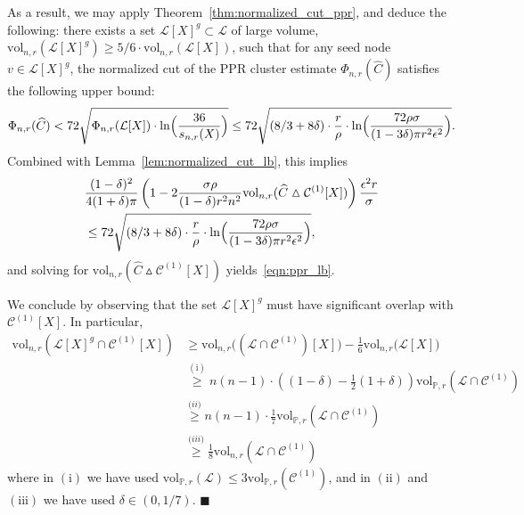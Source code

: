 \documentclass[twoside,11pt]{article}
\newcommand{\1}{\mathbf{1}}
\newcommand{\mc}[1]{\mathcal{#1}}
\newcommand{\Pbb}{\mathbb{P}}
\newcommand{\wh}[1]{\widehat{#1}}
\newcommand{\vol}{\mathrm{vol}}
\newcommand{\qed}{\hfill $\blacksquare$}
\begin{document}
As a result, we may apply Theorem~\ref{thm:normalized_cut_ppr}, and deduce the following: there exists a set $\mc{L}[X]^g \subset \mc{L}$ of large volume, $\vol_{n,r}(\mc{L}[X]^g) \geq 5/6 \cdot \vol_{n,r}(\mc{L}[X])$, such that for any seed node $v \in \mc{L}[X]^g$, the normalized cut of the PPR cluster estimate $\Phi_{n,r}(\wh{C})$ satisfies the following upper bound:
\begin{equation*}
\Phi_{n,r}(\wh{C}) < 72\sqrt{\Phi_{n,r}(\mc{L}[X]) \cdot \ln\Bigl(\frac{36}{s_{n,r}(X)}\Bigr)} \leq  72\sqrt{(8/3 + 8\delta) \cdot \frac{r}{\rho} \cdot \ln\Bigl(\frac{72 \rho \sigma}{(1 - 3\delta)\pi r^2 \epsilon^2}\Bigr)}.
\end{equation*}	
Combined with Lemma~\ref{lem:normalized_cut_lb}, this implies
\begin{equation}
\begin{aligned}
\label{pf:ppr_lb_3}
&\frac{(1 - \delta)^2}{4(1 + \delta)\pi} \left(1 - 2 \frac{\sigma \rho}{(1 - \delta) r^2 n^2} \vol_{n,r}(\wh{C} \vartriangle \mc{C}^{(1)}[X]) \right) \frac{\epsilon^2 r}{\sigma} \\
& \leq 72\sqrt{(8/3 + 8\delta) \cdot \frac{r}{\rho} \cdot \ln\Bigl(\frac{72 \rho \sigma}{(1 - 3\delta)\pi r^2 \epsilon^2}\Bigr)},
\end{aligned}
\end{equation}
and solving for $\vol_{n,r}(\wh{C} \vartriangle \mc{C}^{(1)}[X])$ yields~\eqref{eqn:ppr_lb}. 

We conclude by observing that the set $\mc{L}[X]^g$ must have significant overlap with $\mc{C}^{(1)}[X]$. In particular,
\begin{align*}
\vol_{n,r}(\mathcal{L}[X]^g \cap \mc{C}^{(1)}[X]) & \geq \vol_{n,r}\bigl((\mathcal{L} \cap \mc{C}^{(1)})[X]\bigr) - \frac{1}{6}\vol_{n,r}\bigl(\mc{L}[X]\bigr) \\
& \overset{\mathrm{(i)}}{\geq} n(n-1) \cdot \left((1 - \delta) - \frac{1}{2}(1 + \delta)\right)\vol_{\Pbb,r}( \mathcal{L} \cap \mc{C}^{(1)}) \\
& \overset{\mathrm(ii)}{\geq} n(n - 1) \cdot \frac{1}{7} \vol_{\Pbb,r}( \mathcal{L} \cap \mc{C}^{(1)}) \\
& \overset{\mathrm(iii)}{\geq} \frac{1}{8} \vol_{n,r}( \mathcal{L} \cap \mc{C}^{(1)})
\end{align*}
where in $\mathrm{(i)}$ we have used $\vol_{\Pbb,r}(\mc{L}) \leq 3 \vol_{\Pbb,r}(\mc{C}^{(1)})$, and in $\mathrm{(ii)}$ and $\mathrm{(iii)}$ we have used $\delta \in (0,1/7)$. \qed \\
\end{document}
